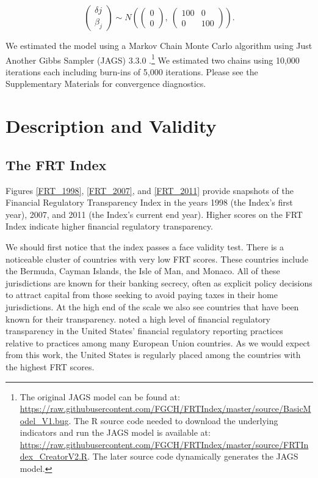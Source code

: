 \documentclass[a4paper]{article}
\begin{document}
\begin{equation}
    \begin{pmatrix}
      \delta{j} \\
      \beta_{j}
    \end{pmatrix} 
    \sim N 
    \left(
        \begin{pmatrix} 
            0 \\
            0 
        \end{pmatrix}
            ,\:
        \begin{pmatrix} 
            100 & 0 \\
            0 & 100
        \end{pmatrix}
    \right). 
\end{equation}

We estimated the model using a Markov Chain Monte Carlo algorithm using Just Another Gibbs Sampler (JAGS) 3.3.0 \citep{Plummer2003}.\footnote{The original JAGS model can be found at: \url{https://raw.githubusercontent.com/FGCH/FRTIndex/master/source/BasicModel_V1.bug}. The R \citep{RCite} source code needed to download the underlying indicators and run the JAGS model is available at: \url{https://raw.githubusercontent.com/FGCH/FRTIndex/master/source/FRTIndex_CreatorV2.R}. The later source code dynamically generates the JAGS model.} We estimated two chains using 10,000 iterations each including burn-ins of 5,000 iterations. Please see the Supplementary Materials for convergence diagnostics. 


\section{Description and Validity}


\subsection{The FRT Index}

Figures \ref{FRT_1998}, \ref{FRT_2007}, and \ref{FRT_2011} provide snapshots of the Financial Regulatory Transparency Index in the years 1998 (the Index's first year), 2007, and 2011 (the Index's current end year). Higher scores on the FRT Index indicate higher financial regulatory transparency.

We should first notice that the index passes a face validity test. There is a noticeable cluster of countries with very low FRT scores. These countries include the Bermuda, Cayman Islands, the Isle of Man, and Monaco. All of these jurisdictions are known for their banking secrecy, often as explicit policy decisions to attract capital from those seeking to avoid paying taxes in their home jurisdictions. At the high end of the scale we also see countries that have been known for their transparency. \cite{Gandrud2014a} noted a high level of financial regulatory transparency in the United States' financial regulatory reporting practices relative to practices among many European Union countries. As we would expect from this work, the United States is regularly placed among the countries with the highest FRT scores.  
\end{document}
